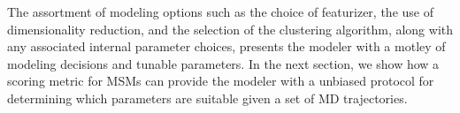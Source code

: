 The assortment of modeling options such as the choice of featurizer, the
use of dimensionality reduction, and the selection of the clustering
algorithm, along with any associated internal parameter choices, presents
the modeler with a motley of modeling decisions and tunable parameters.
In the next
section, we show how a scoring metric for MSMs can provide the modeler with
a unbiased protocol for determining which parameters are suitable given a
set of MD trajectories.

